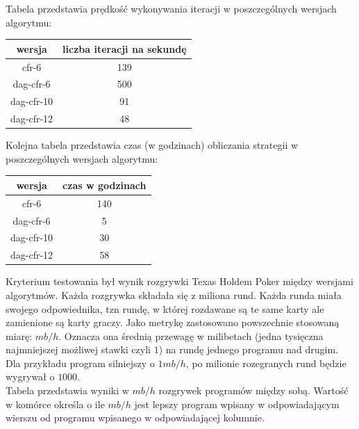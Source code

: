 \documentclass[magisterska]{pracamgr}
\begin{document}
\noindent
Tabela przedstawia prędkość wykonywania iteracji w poszczególnych wersjach algorytmu:

\begin{table}[h]
\begin{tabular}{|c|c|}
\hline
wersja     & liczba iteracji na sekundę \\ \hline
cfr-6      & 139                        \\ \hline
dag-cfr-6  & 500                        \\ \hline
dag-cfr-10 & 91                         \\ \hline
dag-cfr-12 & 48                         \\ \hline
\end{tabular}
\end{table}

\noindent
Kolejna tabela przedstawia czas (w godzinach) obliczania strategii w poszczególnych wersjach algorytmu:

\begin{table}[h]
\begin{tabular}{|c|c|}
\hline
wersja     & czas w godzinach           \\ \hline
cfr-6      & 140                        \\ \hline
dag-cfr-6  & 5                          \\ \hline
dag-cfr-10 & 30                         \\ \hline
dag-cfr-12 & 58                         \\ \hline
\end{tabular}
\end{table}

\noindent
Kryterium testowania był wynik rozgrywki Texas Holdem Poker między wersjami algorytmów.
Każda rozgrywka składała się z miliona rund. Każda runda miała swojego odpowiednika, tzn
rundę, w której rozdawane są te same karty ale zamienione są karty graczy. Jako metrykę
zastosowano powszechnie stosowaną miarę: $mb/h$. Oznacza ona średnią przewagę w milibetach (jedna tysięczna najmniejszej możliwej stawki czyli $1$)
na rundę jednego programu nad drugim. Dla przykładu program silniejszy o $1mb/h$, po milionie
rozegranych rund będzie wygrywał o $1000$. \\

\noindent
Tabela przedstawia wyniki w $mb/h$ rozgrywek programów między sobą. Wartość w komórce
określa o ile $mb/h$ jest lepszy program wpisany w odpowiadającym wierszu od programu wpisanego w odpowiadającej
kolumnie.
\end{document}
